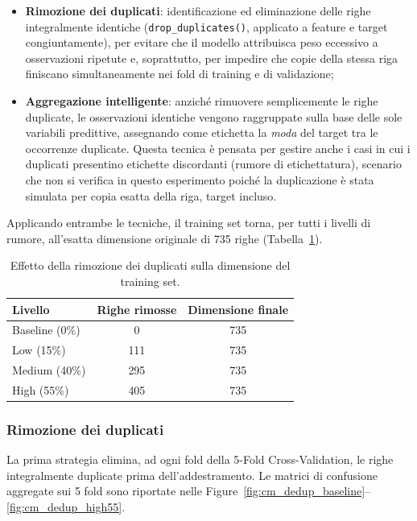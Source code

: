 \documentclass[12pt]{article}
\begin{document}
\begin{itemize}
    \item \textbf{Rimozione dei duplicati}: identificazione ed eliminazione delle righe integralmente identiche (\texttt{drop\_duplicates()}, applicato a feature e target congiuntamente), per evitare che il modello attribuisca peso eccessivo a osservazioni ripetute e, soprattutto, per impedire che copie della stessa riga finiscano simultaneamente nei fold di training e di validazione;
    \item \textbf{Aggregazione intelligente}: anziché rimuovere semplicemente le righe duplicate, le osservazioni identiche vengono raggruppate sulla base delle sole variabili predittive, assegnando come etichetta la \emph{moda} del target tra le occorrenze duplicate. Questa tecnica è pensata per gestire anche i casi in cui i duplicati presentino etichette discordanti (rumore di etichettatura), scenario che non si verifica in questo esperimento poiché la duplicazione è stata simulata per copia esatta della riga, target incluso.
\end{itemize}

Applicando entrambe le tecniche, il training set torna, per tutti i livelli di rumore, all'esatta dimensione originale di 735 righe (Tabella~\ref{tab:dedup_rows}).

\begin{table}[H]
\centering
\begin{tabular}{lcc}
\toprule
\textbf{Livello} & \textbf{Righe rimosse} & \textbf{Dimensione finale} \\
\midrule
Baseline (0\%) & 0 & 735 \\
Low (15\%) & 111 & 735 \\
Medium (40\%) & 295 & 735 \\
High (55\%) & 405 & 735 \\
\bottomrule
\end{tabular}
\caption{Effetto della rimozione dei duplicati sulla dimensione del training set.}
\label{tab:dedup_rows}
\end{table}

\subsubsection{Rimozione dei duplicati}

La prima strategia elimina, ad ogni fold della 5-Fold Cross-Validation, le righe integralmente duplicate prima dell'addestramento. Le matrici di confusione aggregate sui 5 fold sono riportate nelle Figure~\ref{fig:cm_dedup_baseline}--\ref{fig:cm_dedup_high55}.
\end{document}
